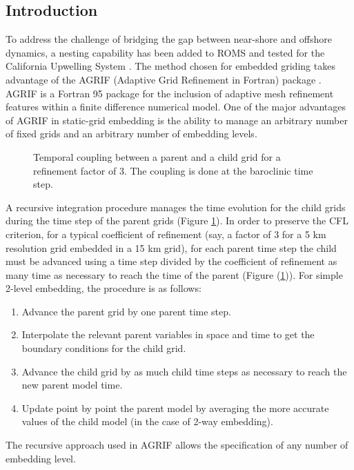 %
%

\subsection{Introduction}

To address the challenge of bridging the gap between near-shore and
offshore dynamics, a nesting capability has been added to ROMS
and tested for the California Upwelling System \citep{Pen04}.
The method chosen for embedded griding takes advantage of the AGRIF
(Adaptive Grid Refinement in Fortran) package \citep{Bla99,Deb00,
Deb03a,Deb03b}.
AGRIF is a Fortran 95 package for the inclusion of adaptive mesh refinement
features within a finite difference numerical model. One of
the major advantages of AGRIF in static-grid embedding is the ability to
manage an arbitrary number of fixed grids and an arbitrary number of
embedding levels.

\begin{figure}[htbp]
\centerline{}
\caption{Temporal coupling between a parent and a child grid
for a refinement factor of 3.  The coupling is done at the baroclinic
time step.}
\label{fig:temp_coupling}
\end{figure}

A recursive integration procedure manages the time evolution for the
child grids during the time step of the parent grids
(Figure \ref{fig:temp_coupling}). In order to preserve the CFL 
criterion, for a typical
coefficient of refinement (say, a factor of 3 for a 5 km resolution
grid embedded in a 15 km grid), for each parent time step the child
must be advanced using a time step divided by the coefficient of
refinement as many time as necessary to reach the time of the parent
(Figure (\ref{fig:temp_coupling})).  For simple 2-level embedding, the
procedure is as follows:\\
\begin{enumerate}
\item Advance the parent grid by one parent time step.
\item Interpolate the relevant parent variables in space and time
to get the boundary conditions for the child grid.
\item Advance the child grid by as much child time steps as necessary
to reach the new parent model time.
\item Update point by point the parent model by averaging the more
accurate values of the child model (in the case of 2-way embedding).
\end{enumerate}
The recursive approach used in AGRIF
allows the specification of any number
of embedding level.

